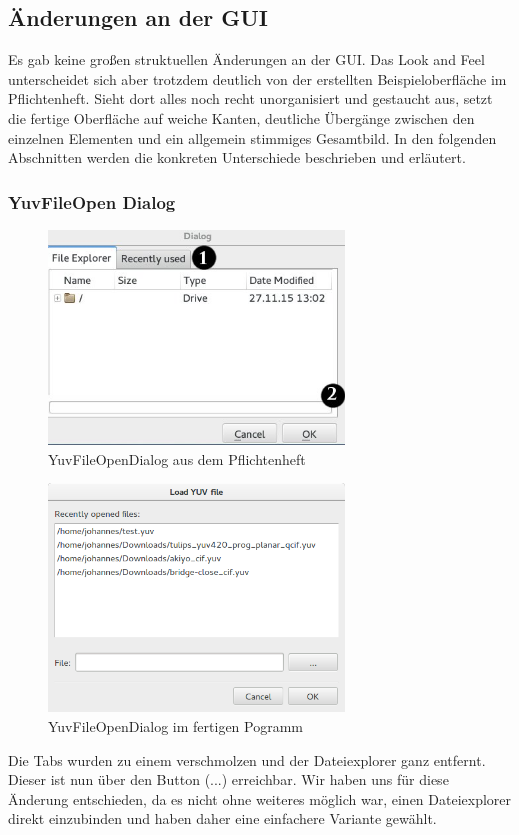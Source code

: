 \documentclass{scrartcl}
\begin{document}
{\subsection{Änderungen an der GUI}
Es gab keine großen struktuellen Änderungen an der GUI. Das Look and Feel unterscheidet sich aber trotzdem deutlich von der erstellten Beispieloberfläche im Pflichtenheft. Sieht dort alles noch recht unorganisiert und gestaucht aus, setzt die fertige Oberfläche auf weiche Kanten, deutliche Übergänge zwischen den einzelnen Elementen und ein allgemein stimmiges Gesamtbild. In den folgenden Abschnitten werden die konkreten Unterschiede beschrieben und erläutert.
\newpage
\subsubsection{YuvFileOpen Dialog}
\bigskip
\begin{figure}[ht]
\centering
\includegraphics[width=0.7\textwidth]{Pictures/fileopenalt.jpg}
\caption{YuvFileOpenDialog aus dem Pflichtenheft}
\end{figure}
\begin{figure}[ht]
\centering
\includegraphics[width=0.7\textwidth]{Pictures/fileopenneu.png}
\caption{YuvFileOpenDialog im fertigen Pogramm}
\end{figure}
Die Tabs wurden zu einem verschmolzen und der Dateiexplorer ganz entfernt. Dieser ist nun über den Button (...) erreichbar. Wir haben uns für diese Änderung entschieden, da es nicht ohne weiteres möglich war, einen Dateiexplorer direkt einzubinden und haben daher eine einfachere Variante gewählt.
\newpage
}
\end{document}
